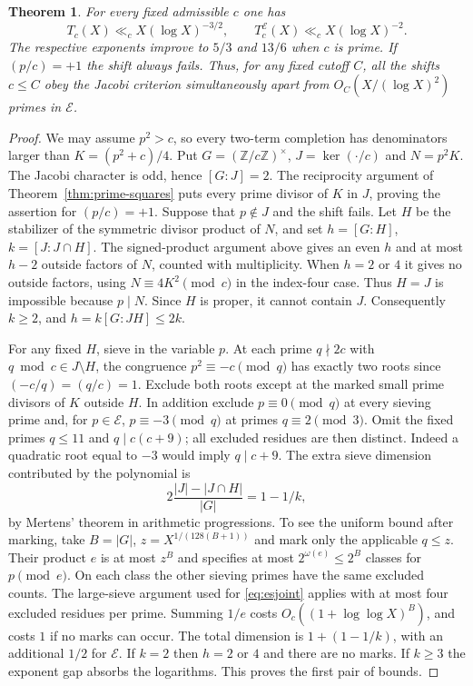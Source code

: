 \documentclass[a4paper,11pt]{article}
\newtheorem{theorem}{Theorem}[section]
\theoremstyle{definition}\newtheorem{question}[theorem]{Question}
\begin{document}
\begin{theorem}\label{thm:squarejacobi}
For every fixed admissible $c$ one has
\[
 T_c(X)\ll_c X(\log X)^{-3/2},\qquad
 T_c^{\mathcal E}(X)\ll_c X(\log X)^{-2}.
\]
The respective exponents improve to $5/3$ and $13/6$ when $c$ is prime.
If $(p/c)=+1$ the shift always fails. Thus, for any fixed cutoff $C$,
all the shifts $c\le C$ obey the Jacobi criterion simultaneously apart
from $O_C(X/(\log X)^2)$ primes in $\mathcal E$.
\end{theorem}

\begin{proof}
We may assume $p^2>c$, so every two-term completion has denominators
larger than $K=(p^2+c)/4$. Put $G=(\mathbb Z/c\mathbb Z)^\times$,
$J=\ker(\cdot/c)$ and $N=p^2K$. The Jacobi character is odd, hence
$[G:J]=2$. The reciprocity argument of Theorem~\ref{thm:prime-squares}
puts every prime divisor of $K$ in $J$, proving the assertion for
$(p/c)=+1$. Suppose that $p\notin J$ and the shift fails. Let $H$
be the stabilizer of the symmetric divisor product of $N$, and set
$h=[G:H]$, $k=[J:J\cap H]$. The signed-product argument above gives
an even $h$ and at most $h-2$ outside factors of $N$, counted with
multiplicity. When $h=2$ or $4$ it gives no outside factors, using
$N\equiv4K^2\pmod c$ in the index-four case. Thus $H=J$ is
impossible because $p\mid N$. Since $H$ is proper, it cannot
contain $J$. Consequently $k\ge2$, and $h=k[G:JH]\le2k$.

For any fixed $H$, sieve in the variable $p$. At each prime $q\nmid2c$
with $q\bmod c\in J\setminus H$, the congruence
$p^2\equiv-c\pmod q$ has exactly two roots since
$(-c/q)=(q/c)=1$. Exclude both roots except at the marked small
prime divisors of $K$ outside $H$. In addition exclude $p\equiv0\pmod q$
at every sieving prime and, for $p\in\mathcal E$,
$p\equiv-3\pmod q$ at primes $q\equiv2\pmod3$. Omit the fixed primes
$q\le 11$ and $q\mid c(c+9)$; all excluded residues are then distinct.
Indeed a quadratic root equal to $-3$ would imply $q\mid c+9$.
The extra sieve dimension contributed by the polynomial is
\[
 2\frac{|J|-|J\cap H|}{|G|}=1-1/k,
\]
by Mertens' theorem in arithmetic progressions. To see the uniform
bound after marking, take $B=|G|$, $z=X^{1/(128(B+1))}$ and mark
only the applicable $q\le z$. Their product $e$ is at most $z^B$ and
specifies at most $2^{\omega(e)}\le 2^B$ classes for $p\pmod e$.
On each class the other sieving primes have the same excluded counts.
The large-sieve argument used for \eqref{eq:esjoint} applies with
at most four excluded residues per prime. Summing $1/e$ costs
$O_c((1+\log\log X)^B)$, and costs $1$ if no marks can occur.
The total dimension is $1+(1-1/k)$, with an additional $1/2$ for
$\mathcal E$. If $k=2$ then $h=2$ or $4$ and there are no marks.
If $k\ge3$ the exponent gap absorbs the logarithms. This proves
the first pair of bounds.


\end{proof}
\end{document}
